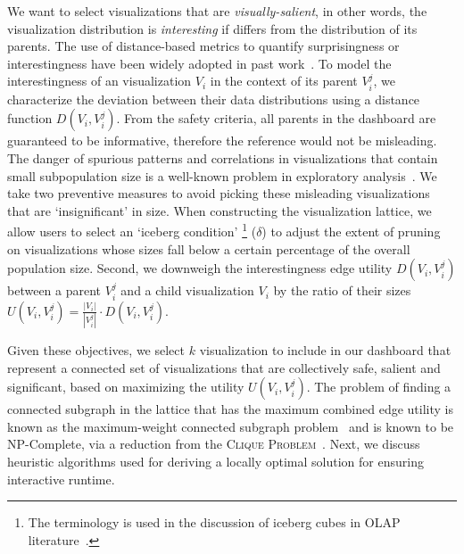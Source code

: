  We want to select visualizations that are \textit{visually-salient}, in other words, the visualization distribution is \textit{interesting} if differs from the distribution of its parents. The use of distance-based metrics to quantify surprisingness or interestingness have been widely adopted in past work~\cite{Vartak2015,Correll2016,Itti2009}. To model the interestingness of an visualization $V_i$ in the context of its parent $V_i^j$, we characterize the deviation between their data distributions using a distance function $D(V_i, V_i^j)$. From the safety criteria, all parents in the dashboard are guaranteed to be informative, therefore the reference would not be misleading. 
 The danger of spurious patterns and correlations in visualizations that contain small subpopulation size is a well-known problem in exploratory analysis~\cite{Binnig2017}. We take two preventive measures to avoid picking these misleading visualizations that are `insignificant' in size. When constructing the visualization lattice, we allow users to select an `iceberg condition' \footnote{The terminology is used in the discussion of iceberg cubes in OLAP literature~\cite{Xin2007}.} ($\delta$) to adjust the extent of pruning on visualizations whose sizes fall below a certain percentage of the overall population size. Second, we downweigh the interestingness edge utility $D(V_i, V_i^j)$ between a parent $V_i^j$ and a child visualization $V_i$ by the ratio of their sizes  $U(V_i, V_i^j) = \frac{|V_i|}{|V_i^{j}|} \cdot D(V_i, V_i^j)$.

Given these objectives, we select $k$ visualization to include in our dashboard that represent a connected set of visualizations that are collectively safe, salient and significant, based on maximizing the utility $U(V_i, V_i^j)$. The problem of finding a connected subgraph in the lattice that has the maximum combined edge utility is known as the maximum-weight connected subgraph problem~\cite{ErnstAlthaus2009} and is known to be NP-Complete, via a reduction from the \textsc{Clique Problem}~\cite{Parameswaran2010}. Next, we discuss heuristic algorithms used for deriving a locally optimal solution for ensuring interactive runtime. 

